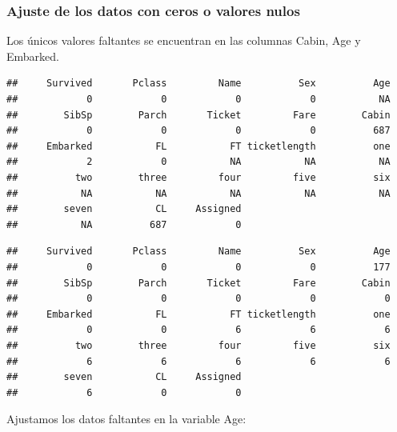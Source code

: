 \documentclass[]{article}
\begin{document}
\subsubsection{Ajuste de los datos con ceros o valores
nulos}\label{ajuste-de-los-datos-con-ceros-o-valores-nulos}

Los únicos valores faltantes se encuentran en las columnas Cabin, Age y
Embarked.

\begin{verbatim}
##     Survived       Pclass         Name          Sex          Age 
##            0            0            0            0           NA 
##        SibSp        Parch       Ticket         Fare        Cabin 
##            0            0            0            0          687 
##     Embarked           FL           FT ticketlength          one 
##            2            0           NA           NA           NA 
##          two        three         four         five          six 
##           NA           NA           NA           NA           NA 
##        seven           CL     Assigned 
##           NA          687            0
\end{verbatim}

\begin{verbatim}
##     Survived       Pclass         Name          Sex          Age 
##            0            0            0            0          177 
##        SibSp        Parch       Ticket         Fare        Cabin 
##            0            0            0            0            0 
##     Embarked           FL           FT ticketlength          one 
##            0            0            6            6            6 
##          two        three         four         five          six 
##            6            6            6            6            6 
##        seven           CL     Assigned 
##            6            0            0
\end{verbatim}

Ajustamos los datos faltantes en la variable Age:
\end{document}
